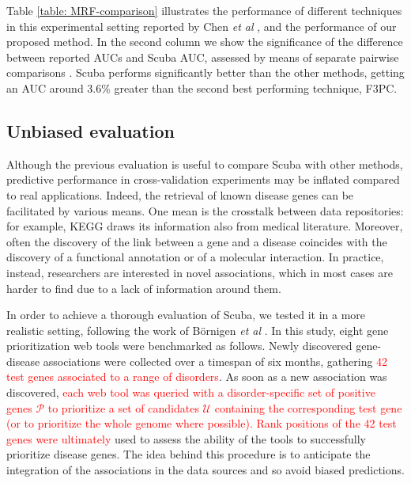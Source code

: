 \documentclass[twocolumn]{bmcart}%
\begin{document}
Table \ref{table: MRF-comparison} illustrates the performance of different techniques in this experimental setting reported by Chen \emph{et al} \cite{f3pc}, and the performance of our proposed method. In the second column we show the significance of the difference between reported AUCs and Scuba AUC, assessed by means of separate pairwise comparisons \cite{hanley}. Scuba performs significantly better than the other methods, getting an AUC around 3.6\% greater than the second best performing technique, F3PC.

\subsection*{Unbiased evaluation}\label{unbiased}
Although the previous evaluation is useful to compare Scuba with other methods, predictive performance in cross-validation experiments may be inflated compared to real applications. Indeed, the retrieval of known disease genes can be facilitated by various means. One mean is the crosstalk between data repositories: for example, KEGG \cite{kegg} draws its information also from medical literature. Moreover, often the discovery of the link between a gene and a disease coincides with the discovery of a functional annotation or of a molecular interaction. In practice, instead, researchers are interested in novel associations, which in most cases are harder to find due to a lack of information around them.

In order to achieve a thorough evaluation of Scuba, we tested it in a more realistic setting, following the work of B\"{o}rnigen \emph{et al} \cite{bornigen}. In this study, eight gene prioritization web tools were benchmarked as follows. Newly discovered gene-disease associations were collected over a timespan of six months, gathering \textcolor{red}{42 test genes associated to a range of disorders}. As soon as a new association was discovered, \textcolor{red}{each web tool was queried with a disorder-specific set of positive genes $\mathcal{P}$ to prioritize a set of candidates $\mathcal{U}$ containing the corresponding test gene (or to prioritize the whole genome where possible). Rank positions of the 42 test genes were ultimately} used to assess the ability of the tools to successfully prioritize disease genes. The idea behind this procedure is to anticipate the integration of the associations in the data sources and so avoid biased predictions.
\end{document}
